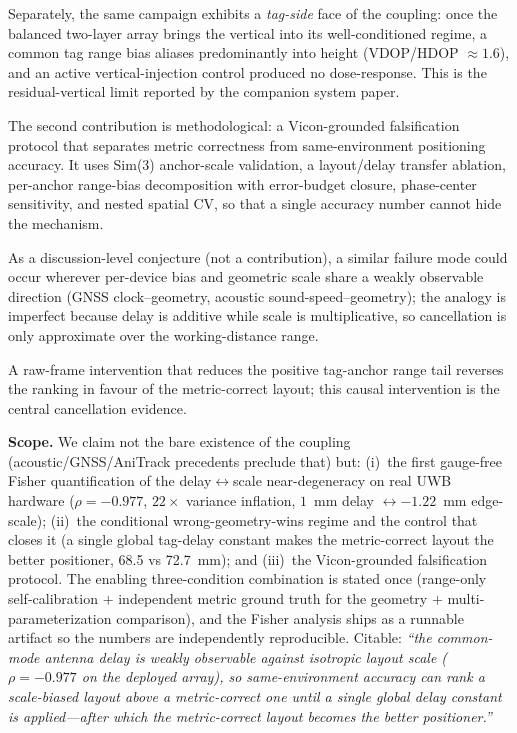 \documentclass[10pt,a4paper]{article}
\begin{document}
Separately, the same campaign exhibits a \emph{tag-side} face of the coupling: once the balanced two-layer array brings the vertical into its well-conditioned regime, a common tag range bias aliases predominantly into height (VDOP/HDOP $\approx 1.6$), and an active vertical-injection control produced no dose-response. This is the residual-vertical limit reported by the companion system paper.

The second contribution is methodological: a Vicon-grounded falsification protocol that separates metric correctness from same-environment positioning accuracy. It uses Sim(3) anchor-scale validation, a layout/delay transfer ablation, per-anchor range-bias decomposition with error-budget closure, phase-center sensitivity, and nested spatial CV, so that a single accuracy number cannot hide the mechanism.

As a discussion-level conjecture (not a contribution), a similar failure mode could occur wherever per-device bias and geometric scale share a weakly observable direction (GNSS clock--geometry, acoustic sound-speed--geometry); the analogy is imperfect because delay is additive while scale is multiplicative, so cancellation is only approximate over the working-distance range.

A raw-frame intervention that reduces the positive tag-anchor range tail reverses the ranking in favour of the metric-correct layout; this causal intervention is the central cancellation evidence.

\textbf{Scope.} We claim not the bare existence of the coupling (acoustic/GNSS/AniTrack precedents preclude that) but: (i)~the first gauge-free Fisher quantification of the delay$\leftrightarrow$scale near-degeneracy on real UWB hardware ($\rho=-0.977$, $22\times$ variance inflation, $1$~mm delay $\leftrightarrow -1.22$~mm edge-scale); (ii)~the conditional wrong-geometry-wins regime and the control that closes it (a single global tag-delay constant makes the metric-correct layout the better positioner, 68.5 vs 72.7~mm); and (iii)~the Vicon-grounded falsification protocol. The enabling three-condition combination is stated once (range-only self-calibration $+$ independent metric ground truth for the geometry $+$ multi-parameterization comparison), and the Fisher analysis ships as a runnable artifact so the numbers are independently reproducible. Citable: \emph{``the common-mode antenna delay is weakly observable against isotropic layout scale ($\rho=-0.977$ on the deployed array), so same-environment accuracy can rank a scale-biased layout above a metric-correct one until a single global delay constant is applied---after which the metric-correct layout becomes the better positioner.''}
\end{document}
